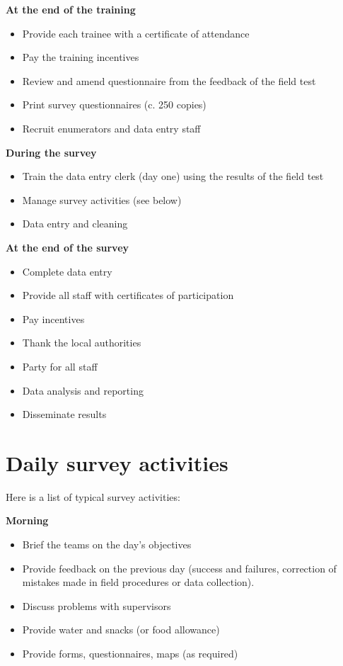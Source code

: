 \documentclass[12pt,a4paper]{book}
\providecommand{\tightlist}{%
  \setlength{\itemsep}{0pt}\setlength{\parskip}{0pt}}
\begin{document}
\textbf{At the end of the training}

\begin{itemize}
\tightlist
\item
  Provide each trainee with a certificate of attendance
\item
  Pay the training incentives
\item
  Review and amend questionnaire from the feedback of the field test
\item
  Print survey questionnaires (c. 250 copies)
\item
  Recruit enumerators and data entry staff
\end{itemize}

\textbf{During the survey}

\begin{itemize}
\tightlist
\item
  Train the data entry clerk (day one) using the results of the field test
\item
  Manage survey activities (see below)
\item
  Data entry and cleaning
\end{itemize}

\textbf{At the end of the survey}

\begin{itemize}
\tightlist
\item
  Complete data entry
\item
  Provide all staff with certificates of participation
\item
  Pay incentives
\item
  Thank the local authorities
\item
  Party for all staff
\item
  Data analysis and reporting
\item
  Disseminate results
\end{itemize}

\hypertarget{daily-survey-activities}{%
\section{Daily survey activities}\label{daily-survey-activities}}

Here is a list of typical survey activities:

\textbf{Morning}

\begin{itemize}
\tightlist
\item
  Brief the teams on the day's objectives
\item
  Provide feedback on the previous day (success and failures, correction of mistakes made in field procedures or data collection).
\item
  Discuss problems with supervisors
\item
  Provide water and snacks (or food allowance)
\item
  Provide forms, questionnaires, maps (as required)
\end{itemize}
\end{document}
